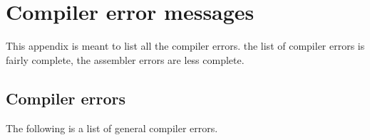 \documentclass{report}
\begin{document}

\chapter{Compiler error messages}
\label{ch:ErrorMessages}
This appendix is meant to list all the compiler errors. the list of compiler
errors is fairly complete, the assembler errors are less complete.

\section{Compiler errors}
The following is a list of general compiler errors. 
\end{document}
